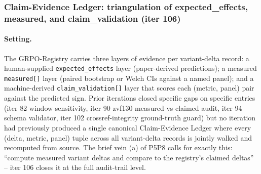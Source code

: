 
\subsubsection{Claim-Evidence Ledger: triangulation of expected\_effects, measured, and claim\_validation (iter 106)}
\label{sec:p6-iter106-claim-evidence-ledger}

\paragraph{Setting.}
The GRPO-Registry carries three layers of evidence per variant-delta record:
a human-supplied \texttt{expected\_effects} layer (paper-derived predictions);
a measured \texttt{measured[]} layer (paired bootstrap or Welch CIs against a
named panel); and a machine-derived \texttt{claim\_validation[]} layer that
scores each (metric, panel) pair against the predicted sign. Prior iterations
closed specific gaps on specific entries (iter 82 window-sensitivity, iter 90
zvf130 measured-vs-claimed audit, iter 94 schema validator, iter 102
crossref-integrity ground-truth guard) but no iteration had previously
produced a single canonical Claim-Evidence Ledger where every (delta, metric,
panel) tuple across all variant-delta records is jointly walked and
recomputed from source. The brief vein (a) of P5P8 calls for exactly this:
``compute measured variant deltas and compare to the registry's claimed
deltas'' -- iter 106 closes it at the full audit-trail level.

